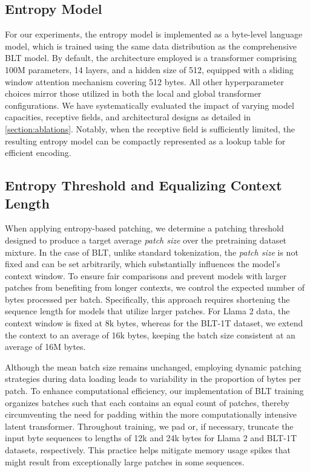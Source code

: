 \subsection{Entropy Model} For our experiments, the entropy model is implemented as a byte-level language model, which is trained using the same data distribution as the comprehensive {\textsc BLT} model. By default, the architecture employed is a transformer comprising 100M parameters, 14 layers, and a hidden size of 512, equipped with a sliding window attention mechanism covering 512 bytes. All other hyperparameter choices mirror those utilized in both the local and global transformer configurations. We have systematically evaluated the impact of varying model capacities, receptive fields, and architectural designs as detailed in \autoref{section:ablations}. Notably, when the receptive field is sufficiently limited, the resulting entropy model can be compactly represented as a lookup table for efficient encoding.

\subsection{Entropy Threshold and Equalizing Context Length} When applying entropy-based patching, we determine a patching threshold designed to produce a target average \textit{patch size} over the pretraining dataset mixture. In the case of {\textsc BLT}, unlike standard tokenization, the \textit{patch size} is not fixed and can be set arbitrarily, which substantially influences the model's context window. To ensure fair comparisons and prevent models with larger patches from benefiting from longer contexts, we control the expected number of bytes processed per batch. Specifically, this approach requires shortening the sequence length for models that utilize larger patches. For Llama 2 data, the context window is fixed at 8k bytes, whereas for the {\textsc BLT}-1T dataset, we extend the context to an average of 16k bytes, keeping the batch size consistent at an average of 16M bytes.

Although the mean batch size remains unchanged, employing dynamic patching strategies during data loading leads to variability in the proportion of bytes per patch. To enhance computational efficiency, our implementation of {\textsc BLT} training organizes batches such that each contains an equal count of patches, thereby circumventing the need for padding within the more computationally intensive latent transformer. Throughout training, we pad or, if necessary, truncate the input byte sequences to lengths of 12k and 24k bytes for Llama 2 and {\textsc BLT}-1T datasets, respectively. This practice helps mitigate memory usage spikes that might result from exceptionally large patches in some sequences.

